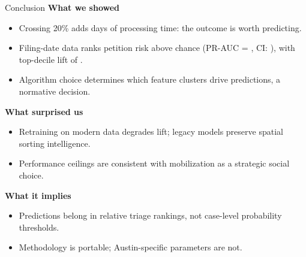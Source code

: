 \documentclass[10pt, aspectratio=169]{beamer}
\begin{document}
\begin{frame}{Conclusion}
    \small
    \textbf{What we showed}
    \begin{itemize}
        \item Crossing 20\% adds \metricRDDelay{} days of processing time: the outcome is worth predicting.
        \item Filing-date data ranks petition risk above chance (PR-AUC = \metricBootstrapFiling{}, CI: \metricBootstrapFilingCI{}), with top-decile lift of \metricTopDecileLift{}.
        \item Algorithm choice determines which feature clusters drive predictions, a normative decision.
    \end{itemize}

    \textbf{What surprised us}
    \begin{itemize}
        \item Retraining on modern data degrades lift; legacy models preserve spatial sorting intelligence.
        \item Performance ceilings are consistent with mobilization as a strategic social choice.
    \end{itemize}

    \textbf{What it implies}
    \begin{itemize}
        \item Predictions belong in relative triage rankings, not case-level probability thresholds.
        \item Methodology is portable; Austin-specific parameters are not.
    \end{itemize}
\end{frame}
\end{document}
